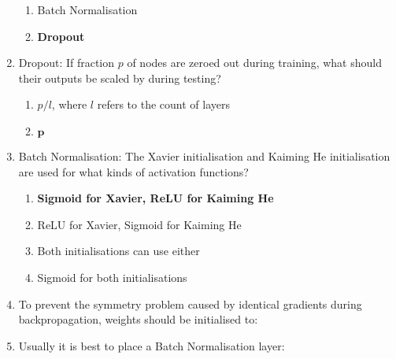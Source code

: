 \documentclass{report}
\numberwithin{equation}{section}
\begin{document}
\begin{enumerate}
\begin{enumerate}[label=\alph*.]
        \item Batch Normalisation
        \item \textbf{Dropout}
    \end{enumerate}
        \item Dropout: If fraction $p$ of nodes are zeroed out during training, what should their outputs be scaled by during testing?
    \begin{enumerate}[label=\alph*.]
        \item $p/l$, where $l$ refers to the count of layers
        \item $\mathbf{p}$
    \end{enumerate}
        \item Batch Normalisation: The Xavier initialisation and Kaiming He initialisation are used for what kinds of activation functions?
    \begin{enumerate}[label=\alph*.]
        \item \textbf{Sigmoid for Xavier, ReLU for Kaiming He}
        \item ReLU for Xavier, Sigmoid for Kaiming He
        \item Both initialisations can use either
        \item Sigmoid for both initialisations
    \end{enumerate}
        \item To prevent the symmetry problem caused by identical gradients during backpropagation, weights should be initialised to:
        \item Usually it is best to place a Batch Normalisation layer:

\end{enumerate}
\end{document}
